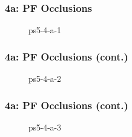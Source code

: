 \documentclass[../report.tex]{subfiles}
\begin{document}
    
    \begin{frame}
        \frametitle{4a: PF Occlusions}
        \begin{figure}[!htb]
            \centering
            \caption{ps5-4-a-1}
        \end{figure}
    \end{frame}

    \begin{frame}
        \frametitle{4a: PF Occlusions (cont.)}
        \begin{figure}[!htb]
            \centering
            \caption{ps5-4-a-2}
        \end{figure}
    \end{frame}

    \begin{frame}
        \frametitle{4a: PF Occlusions (cont.)}
        \begin{figure}[!htb]
            \centering
            \caption{ps5-4-a-3}
        \end{figure}
    \end{frame}
\end{document}
